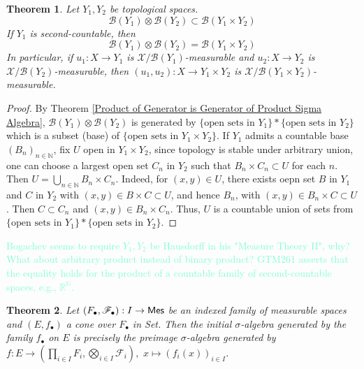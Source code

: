 \documentclass[11pt, a4paper, openany]{book}
\newtheorem{thm}{Theorem}\newtheorem{lem}{Lemma}\newtheorem{crl}{Corollary}
\theoremstyle{definition}
\newcommand{\cat}[1]{\textup{\textsf{#1}}}
\begin{document}
    \begin{thm}\label{Borel sigma algebra of product space}
        Let $Y_1,Y_2$ be topological spaces.
        \[
            \mathscr{B}(Y_1)\otimes \mathscr{B}(Y_2)\subset\mathscr{B}(Y_1\times Y_2)
        \]
        If $Y_1$ is second-countable, then
        \[
            \mathscr{B}(Y_1)\otimes \mathscr{B}(Y_2)=\mathscr{B}(Y_1\times Y_2)
        \]
        In particular, if $u_1:X\rightarrow Y_1$ is $\mathscr{X}/\mathscr{B}(Y_1)$-measurable and $u_2:X\rightarrow Y_2$ is $\mathscr{X}/\mathscr{B}(Y_2)$-measurable, then $(u_1,u_2):X\rightarrow Y_1\times Y_2$ is $\mathscr{X}/\mathscr{B}(Y_1\times Y_2)$-measurable.
    \end{thm}
    \begin{proof}
        By Theorem \ref{Product of Generator is Generator of Product Sigma Algebra}, $\mathscr{B}(Y_1)\otimes \mathscr{B}(Y_2)$ is generated by $\{\text{open sets in }Y_1\}*\{\text{open sets in }Y_2\}$ which is a subset (base) of $\{\text{open sets in }Y_1\times Y_2\}$. If $Y_1$ admits a countable base $(B_n)_{n\in\mathbb{N}}$, fix $U$ open in $Y_1\times Y_2$, since topology is stable under arbitrary union, one can choose a largest open set $C_n$ in $Y_2$ such that $B_n\times C_n\subset U$ for each $n$. Then $U=\bigcup_{n\in\mathbb{N}} B_n\times C_n$. Indeed, for $(x,y)\in U$, there exists oepn set $B$ in $Y_1$ and $C$ in $Y_2$ with $(x,y)\in B\times C\subset U$, and hence $B_n$, with $(x,y)\in B_n\times C\subset U$. Then $C\subset C_n$ and $(x,y)\in B_n\times C_n$. Thus, $U$ is a countable union of sets from $\{\text{open sets in }Y_1\}*\{\text{open sets in }Y_2\}$.
    \end{proof}
    \textcolor{Aquamarine}{Bogachev seems to require $Y_1,Y_2$ be Hausdorff in his "Measure Theory II", why? What about arbitrary product instead of binary product? GTM261 asserts that the equality holds for the product of a countable family of second-countable spaces, e.g., $\mathbb{R}^\mathbb{N}$.}
    \begin{thm}
        Let $(F_{\bullet},\mathscr{F}_{\bullet}):I\rightarrow \cat{Mes}$ be an indexed family of measurable spaces and $(E,f_{\bullet})$ a cone over $F_{\bullet}$ in \cat{Set}. Then the initial $\sigma$-algebra generated by the family $f_\bullet$ on $E$ is precisely the preimage $\sigma$-algebra generated by $f:E\rightarrow (\prod_{i\in I}F_i,\bigotimes_{i\in I}\mathscr{F}_i),\,\,x\mapsto (f_i(x))_{i\in I}$.
    \end{thm}
\end{document}
